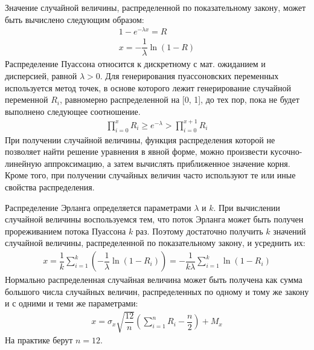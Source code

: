 Значение случайной величины, распределенной по показательному закону, может быть вычислено следующим образом:
%
\begin{gather*}
    1 - e^{-\lambda x} = R\\
    x = -\dfrac{1}{\lambda}\ln(1-R)
\end{gather*}
%
Распределение Пуассона относится к дискретному с мат. ожиданием и дисперсией, равной ${\lambda > 0}$. Для генерирования пуассоновских переменных используется метод точек, в основе которого лежит генерирование случайной переменной $R_i$, равномерно распределенной на [0, 1], до тех пор, пока не будет выполнено следующее соотношение.
%
\begin{gather*}
    \prod\limits_{i=0}^{x}R_i\geqslant e^{-\lambda} > \prod\limits_{i=0}^{x+1}R_i
\end{gather*}
%
При получении случайной величины, функция распределения которой не позволяет найти решение уравнения в явной форме, можно произвести кусочно-линейную аппроксимацию, а затем вычислять приближенное значение корня. Кроме того, при получении случайных величин часто используют те или иные свойства распределения.

Распределение Эрланга определяется параметрами $\lambda$ и $k$. При вычислении случайной величины воспользуемся тем, что поток Эрланга может быть получен прореживанием потока Пуассона $k$ раз. Поэтому достаточно получить $k$ значений случайной величины, распределенной по показательному закону, и усреднить их:
%
\begin{gather*}
    x = \dfrac{1}{k}\sum\limits_{i=1}^{k}\left(-\dfrac{1}{\lambda}\ln(1-R_i)\right) = -\dfrac{1}{k\lambda} \sum\limits_{i=1}^{k}\ln(1-R_i)
\end{gather*}
%
Нормально распределенная случайная величина может быть получена как сумма большого числа случайных величин, распределенных по одному и тому же закону и с одними и теми же параметрами:
%
\begin{gather*}
    x = \sigma_x\sqrt{\dfrac{12}{n}}\left(\sum\limits_{i=1}^n R_i - \dfrac{n}{2}\right) + M_x
\end{gather*}
%
На практике берут ${n = 12}$.